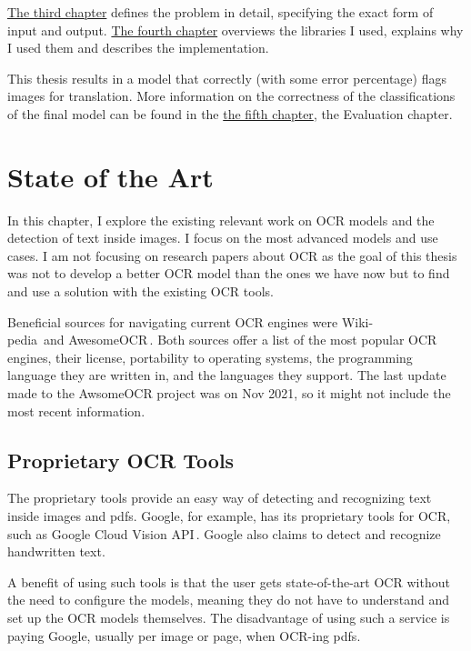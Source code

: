 \documentclass[
  digital,     %
  oneside,     %
  nosansbold,  %
  nocolorbold, %
  nolof,         %
  nolot,         %
]{fithesis4}
\begin{document}
\hyperref[chap:def-of-the-problem]{The third chapter} defines the problem in detail, specifying the exact form of input and output. \hyperref[chap:implementation]{The fourth chapter} overviews the libraries I used, explains why I used them and describes the implementation.

This thesis results in a model that correctly (with some error percentage) flags images for translation. More information on the correctness of the classifications of the final model can be found in the \hyperref[chap:evaluation]{the fifth chapter}, the Evaluation chapter.

\chapter{State of the Art}\label{chap:sota}

In this chapter, I explore the existing relevant work on OCR models and the detection of text inside images. I focus on the most advanced models and use cases. I am not focusing on research papers about OCR as the goal of this thesis was not to develop a better OCR model than the ones we have now but to find and use a solution with the existing OCR tools.

Beneficial sources for navigating current OCR engines were Wiki-\\pedia\,\cite{ocrwikipedia} and AwesomeOCR\,\cite{awesomeocr}. Both sources offer a list of the most popular OCR engines, their license, portability to operating systems, the programming language they are written in, and the languages they support. The last update made to the AwsomeOCR project was on Nov 2021, so it might not include the most recent information.

\section{Proprietary OCR Tools}

The proprietary tools provide an easy way of detecting and recognizing text inside images and pdfs. Google, for example, has its proprietary tools for OCR, such as Google Cloud Vision API\,\cite{googleapi}. Google also claims to detect and recognize handwritten text.

A benefit of using such tools is that the user gets state-of-the-art OCR without the need to configure the models, meaning they do not have to understand and set up the OCR models themselves. The disadvantage of using such a service is paying Google, usually per image or page, when OCR-ing pdfs.
\end{document}
